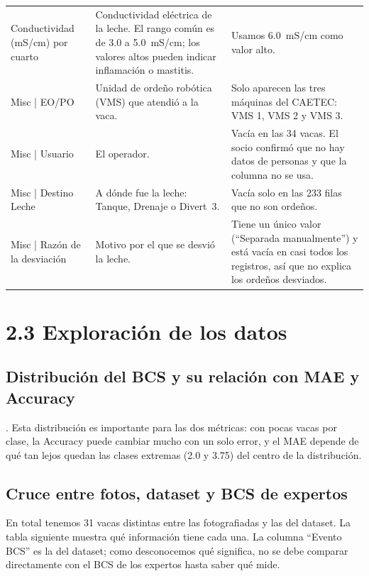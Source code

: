 \documentclass[11pt,letterpaper,DIV=12]{scrartcl}
\begin{document}
\begin{small}
\begin{longtable}{L{3.6cm}L{5.4cm}L{6cm}}
Conductividad (mS/cm) por cuarto & Conductividad eléctrica de la leche. El rango común es de 3.0 a 5.0~mS/cm; los valores altos pueden indicar inflamación o mastitis.  & Usamos 6.0~mS/cm como valor alto. \\
Misc | EO/PO & Unidad de ordeño robótica (VMS) que atendió a la vaca. & Solo aparecen las tres máquinas del CAETEC: VMS 1, VMS 2 y VMS 3. \\
Misc | Usuario & El operador. & Vacía en las 34 vacas. El socio confirmó que no hay datos de personas y que la columna no se usa. \\
Misc | Destino Leche & A dónde fue la leche: Tanque, Drenaje o Divert~3. & Vacía solo en las 233 filas que no son ordeños. \\
Misc | Razón de la desviación & Motivo por el que se desvió la leche. & Tiene un único valor (``Separada manualmente'') y está vacía en casi todos los registros, así que no explica los ordeños desviados. \\
\end{longtable}
\end{small}

\section{2.3 Exploración de los datos}

\subsection{Distribución del BCS y su relación con MAE y Accuracy}

. Esta distribución es importante para las dos métricas: con pocas vacas por clase, la Accuracy puede cambiar mucho con un solo error, y el MAE depende de qué tan lejos quedan las clases extremas (2.0 y 3.75) del centro de la distribución.

\subsection{Cruce entre fotos, dataset y BCS de expertos}

En total tenemos 31 vacas distintas entre las fotografiadas y las del dataset. La tabla siguiente muestra qué información tiene cada una. La columna ``Evento BCS'' es la del dataset; como desconocemos qué significa, no se debe comparar directamente con el BCS de los expertos hasta saber qué mide.
\end{document}
